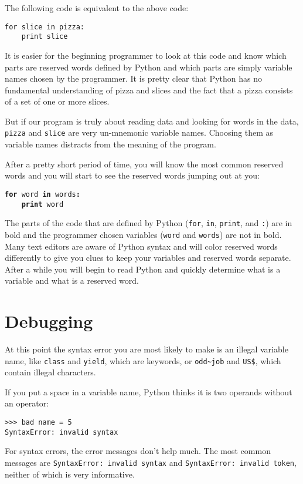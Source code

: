 The following code is equivalent to the above code:

\beforeverb
\begin{verbatim}
for slice in pizza:
    print slice
\end{verbatim}
\afterverb
%
It is easier for the beginning programmer to look at this code and know which 
parts are reserved words defined by Python and which parts are simply variable
names chosen by the programmer.  It is pretty clear that Python has no fundamental
understanding of pizza and slices and the fact that a pizza consists of a set
of one or more slices.

But if our program is truly about reading data and looking for words in the data,
{\tt pizza} and {\tt slice} are very un-mnemonic variable names.  Choosing them 
as variable names distracts from the meaning of the program.

After a pretty short period of time, you will know the most common reserved words
and you will start to see the reserved words jumping out at you:

{\tt {\bf for} word {\bf in} words{\bf :}\\
\verb"    "{\bf print} word }

The parts of the code that are defined by 
Python ({\tt for}, {\tt in}, {\tt print}, and {\tt :}) are in bold
and the programmer chosen variables ({\tt word} and {\tt words}) are not in bold.  
Many text editors are aware of Python
syntax and will color reserved words differently to give you clues to keep 
your variables and reserved words separate.
After a while you will begin to read Python and quickly determine what
is a variable and what is a reserved word.

\section{Debugging}

At this point the syntax error you are most likely to make is
an illegal variable name, like {\tt class} and {\tt yield}, which
are keywords, or \verb"odd~job" and \verb"US$", which contain
illegal characters.


If you put a space in a variable name, Python thinks it is two
operands without an operator:

\beforeverb
\begin{verbatim}
>>> bad name = 5
SyntaxError: invalid syntax
\end{verbatim}
\afterverb
%
For syntax errors, the error messages don't help much.
The most common messages are {\tt SyntaxError: invalid syntax} and
{\tt SyntaxError: invalid token}, neither of which is very informative.

